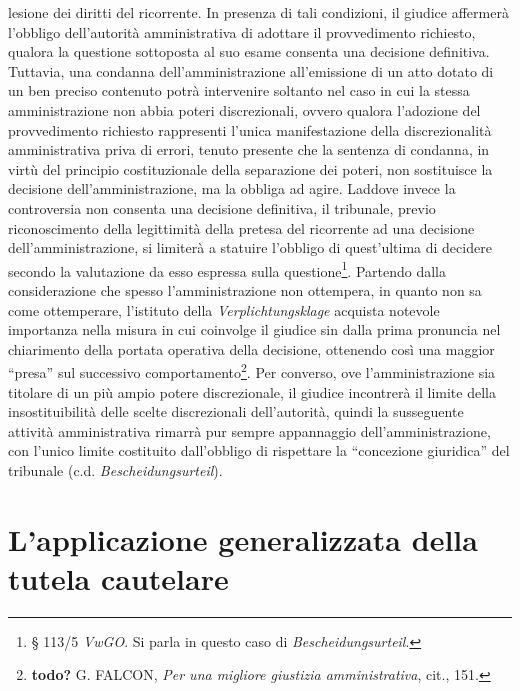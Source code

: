 \documentclass[12pt,it,a4paper,]{report}
\begin{document}
lesione dei diritti del ricorrente. In presenza di tali condizioni, il
giudice affermerà l'obbligo dell'autorità amministrativa di adottare il
provvedimento richiesto, qualora la questione sottoposta al suo esame
consenta una decisione definitiva. Tuttavia, una condanna
dell'amministrazione all'emissione di un atto dotato di un ben preciso
contenuto potrà intervenire soltanto nel caso in cui la stessa
amministrazione non abbia poteri discrezionali, ovvero qualora
l'adozione del provvedimento richiesto rappresenti l'unica
manifestazione della discrezionalità amministrativa priva di errori,
tenuto presente che la sentenza di condanna, in virtù del principio
costituzionale della separazione dei poteri, non sostituisce la
decisione dell'amministrazione, ma la obbliga ad agire. Laddove invece
la controversia non consenta una decisione definitiva, il tribunale,
previo riconoscimento della legittimità della pretesa del ricorrente ad
una decisione dell'amministrazione, si limiterà a statuire l'obbligo di
quest'ultima di decidere secondo la valutazione da esso espressa sulla
questione\footnote{§ 113/5 \emph{VwGO}. Si parla in questo caso di
  \emph{Bescheidungsurteil}.}. Partendo dalla considerazione che spesso
l'amministrazione non ottempera, in quanto non sa come ottemperare,
l'istituto della \emph{Verplichtungsklage} acquista notevole importanza
nella misura in cui coinvolge il giudice sin dalla prima pronuncia nel
chiarimento della portata operativa della decisione, ottenendo così una
maggior ``presa'' sul successivo comportamento\footnote{\textbf{todo?}
  G. FALCON, \emph{Per una migliore giustizia amministrativa}, cit.,
  151.}. Per converso, ove l'amministrazione sia titolare di un più
ampio potere discrezionale, il giudice incontrerà il limite della
insostituibilità delle scelte discrezionali dell'autorità, quindi la
susseguente attività amministrativa rimarrà pur sempre appannaggio
dell'amministrazione, con l'unico limite costituito dall'obbligo di
rispettare la ``concezione giuridica'' del tribunale (c.d.
\emph{Bescheidungsurteil}).

\hypertarget{lapplicazione-generalizzata-della-tutela-cautelare}{%
\section{L'applicazione generalizzata della tutela
cautelare}\label{lapplicazione-generalizzata-della-tutela-cautelare}}
\end{document}
